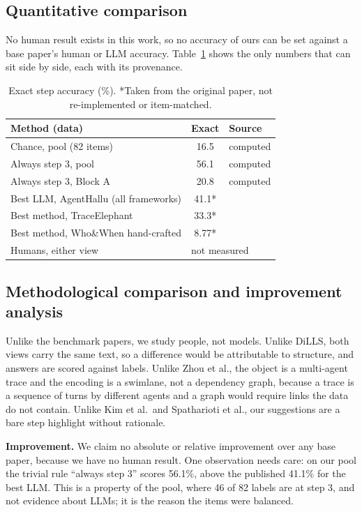 \documentclass[conference]{IEEEtran}
\begin{document}
\subsection{Quantitative comparison}
No human result exists in this work, so no accuracy of ours can be set against a base paper's human or LLM accuracy. Table~\ref{tab:quant} shows the only numbers that can sit side by side, each with its provenance.

\begin{table}[t]
\centering\footnotesize
\caption{Exact step accuracy (\%). *Taken from the original paper, not re-implemented or item-matched.}
\label{tab:quant}
\begin{tabular}{@{}p{4.2cm}cp{1.8cm}@{}}
\toprule
Method (data) & Exact & Source\\
\midrule
Chance, pool (82 items) & 16.5 & computed\\
Always step 3, pool & 56.1 & computed\\
Always step 3, Block A & 20.8 & computed\\
Best LLM, AgentHallu (all frameworks) & 41.1* & \cite{liu2026agenthallu}\\
Best method, TraceElephant & 33.3* & \cite{chen2026elephant}\\
Best method, Who\&When hand-crafted & 8.77* & \cite{zhang2025whowhen}\\
Humans, either view & \multicolumn{2}{l}{not measured}\\
\bottomrule
\end{tabular}
\end{table}

\subsection{Methodological comparison and improvement analysis}
Unlike the benchmark papers, we study people, not models. Unlike DiLLS, both views carry the same text, so a difference would be attributable to structure, and answers are scored against labels. Unlike Zhou et al., the object is a multi-agent trace and the encoding is a swimlane, not a dependency graph, because a trace is a sequence of turns by different agents and a graph would require links the data do not contain. Unlike Kim et al.\ and Spatharioti et al., our suggestions are a bare step highlight without rationale.

\textbf{Improvement.} We claim no absolute or relative improvement over any base paper, because we have no human result. One observation needs care: on our pool the trivial rule ``always step 3'' scores 56.1\%, above the published 41.1\% for the best LLM. This is a property of the pool, where 46 of 82 labels are at step 3, and not evidence about LLMs; it is the reason the items were balanced.
\end{document}
